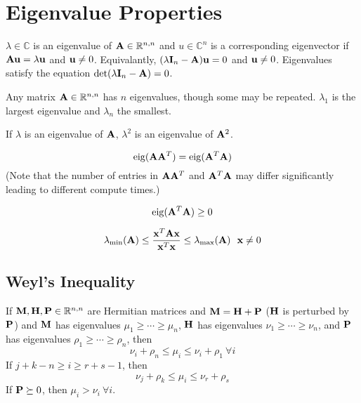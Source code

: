\chapter{Eigenvalue Properties}

$\lambda\in\mathbb{C}$ is an eigenvalue of $\mathbf{A}\in\mathbb{R}^{n,n}$ and $u\in\mathbb{C}^n$ is a corresponding eigenvector if $\mathbf{A}\mathbf{u}=\lambda\mathbf{u}$ and $\mathbf{u}\ne0$. Equivalantly, $(\lambda \mathbf{I}_n-\mathbf{A})\mathbf{u}=0$ and $\mathbf{u}\ne0$. Eigenvalues satisfy the equation $\det(\lambda\mathbf{I}_n-\mathbf{A})=0$.

Any matrix $\mathbf{A}\in\mathbb{R}^{n,n}$ has $n$ eigenvalues, though some may be repeated. $\lambda_1$ is the largest eigenvalue and $\lambda_n$ the smallest.

If $\lambda$ is an eigenvalue of $\mathbf{A}$, $\lambda^2$ is an eigenvalue of $\mathbf{A}^2$.

\begin{equation}
\operatorname{eig}(\mathbf{A}\mathbf{A}^T)=\operatorname{eig}(\mathbf{A}^T\mathbf{A})
\end{equation}
(Note that the number of entries in $\mathbf{A}\mathbf{A}^T$ and $\mathbf{A}^T\mathbf{A}$ may differ significantly leading to different compute times.)

\begin{equation}
\operatorname{eig}(\mathbf{A}^T\mathbf{A})\ge0
\end{equation}

\begin{equation}
\lambda_\textrm{min}(\mathbf{A})\le \frac{\mathbf{x}^T \mathbf{A} \mathbf{x}}{\mathbf{x}^T\mathbf{x}} \le \lambda_\textrm{max}(\mathbf{A})~~\mathbf{x}\ne0
\end{equation}

\section{Weyl's Inequality}
If $\mathbf{M},\mathbf{H},\mathbf{P}\in\mathbb{R}^{n,n}$ are Hermitian matrices and $\mathbf{M}=\mathbf{H}+\mathbf{P}$ ($\mathbf{H}$ is perturbed by $\mathbf{P}$) and $\mathbf{M}$ has eigenvalues $\mu_1\ge\cdots\ge\mu_n$, $\mathbf{H}$ has eigenvalues $\nu_1\ge\cdots\ge\nu_n$, and $\mathbf{P}$ has eigenvalues $\rho_1\ge\cdots\ge\rho_n$, then
\begin{equation}
\nu_i+\rho_n\le \mu_i \le \nu_i + \rho_1~\forall i
\end{equation}
If $j+k-n\ge i \ge r+s-1$, then
\begin{equation}
\nu_j+\rho_k\le\mu_i\le\nu_r+\rho_s
\end{equation}
If $\mathbf{P}\succeq0$, then $\mu_i>\nu_i~\forall i$.


